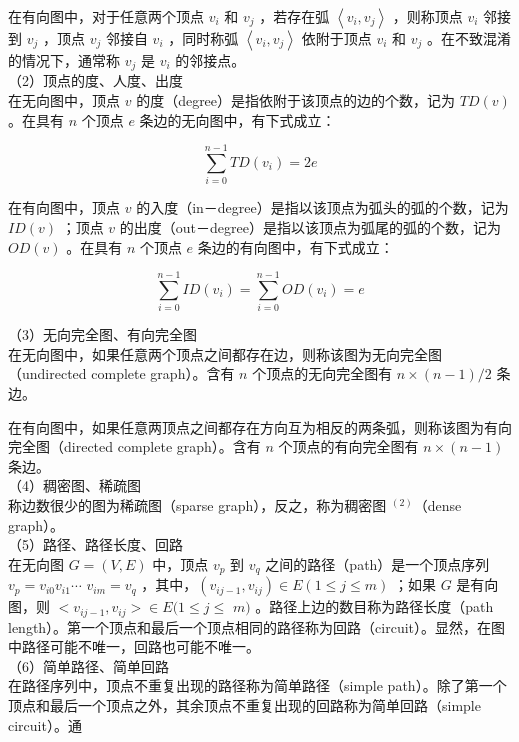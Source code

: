 \documentclass[10pt]{article}
\begin{document}
在有向图中，对于任意两个顶点 $v_{i}$ 和 $v_{j}$ ，若存在弧 $\left\langle v_{i}, v_{j}\right\rangle$ ，则称顶点 $v_{i}$ 邻接到 $v_{j}$ ，顶点 $v_{j}$ 邻接自 $v_{i}$ ，同时称弧 $\left\langle v_{i}, v_{j}\right\rangle$ 依附于顶点 $v_{i}$ 和 $v_{j}$ 。在不致混淆的情况下，通常称 $v_{j}$ 是 $v_{i}$ 的邻接点。\\
（2）顶点的度、人度、出度\\
在无向图中，顶点 $v$ 的度（degree）是指依附于该顶点的边的个数，记为 $T D(v)$ 。在具有 $n$ 个顶点 $e$ 条边的无向图中，有下式成立：


\begin{equation*}
\sum_{i=0}^{n-1} T D\left(v_{i}\right)=2 e \tag{6-1}
\end{equation*}


在有向图中，顶点 $v$ 的入度（in－degree）是指以该顶点为弧头的弧的个数，记为 $I D(v)$ ；顶点 $v$ 的出度（out－degree）是指以该顶点为弧尾的弧的个数，记为 $O D(v)$ 。在具有 $n$ 个顶点 $e$ 条边的有向图中，有下式成立：


\begin{equation*}
\sum_{i=0}^{n-1} I D\left(v_{i}\right)=\sum_{i=0}^{n-1} O D\left(v_{i}\right)=e \tag{6-2}
\end{equation*}


（3）无向完全图、有向完全图\\
在无向图中，如果任意两个顶点之间都存在边，则称该图为无向完全图（undirected complete graph）。含有 $n$ 个顶点的无向完全图有 $n \times(n-1) / 2$ 条边。

在有向图中，如果任意两顶点之间都存在方向互为相反的两条弧，则称该图为有向完全图（directed complete graph）。含有 $n$ 个顶点的有向完全图有 $n \times(n-1)$ 条边。\\
（4）稠密图、稀疏图\\
称边数很少的图为稀疏图（sparse graph），反之，称为稠密图 ${ }^{(2)}$（dense graph）。\\
（5）路径、路径长度、回路\\
在无向图 $G=(V, E)$ 中，顶点 $v_{p}$ 到 $v_{q}$ 之间的路径（path）是一个顶点序列 $v_{p}=v_{i 0} v_{i 1} \cdots$ $v_{i m}=v_{q}$ ，其中，$\left(v_{i j-1}, v_{i j}\right) \in E(1 \leqslant j \leqslant m)$ ；如果 $G$ 是有向图，则 $<v_{i j-1}, v_{i j}>\in E(1 \leqslant j \leqslant$ $m)$ 。路径上边的数目称为路径长度（path length）。第一个顶点和最后一个顶点相同的路径称为回路（circuit）。显然，在图中路径可能不唯一，回路也可能不唯一。\\
（6）简单路径、简单回路\\
在路径序列中，顶点不重复出现的路径称为简单路径（simple path）。除了第一个顶点和最后一个顶点之外，其余顶点不重复出现的回路称为简单回路（simple circuit）。通
\end{document}
